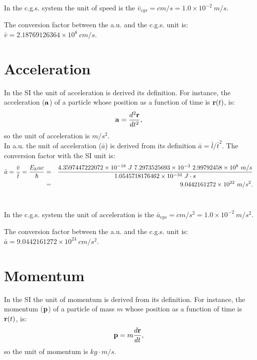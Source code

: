\documentclass[12pt,a4paper]{article}
\def\hbarf{1.0545718176462\times 10^{-34}}
\def\cspeed{2.99792458\times 10^{8}}
\def\alphaf{7.2973525693\times 10^{-3}}
\def\bara{9.0442161272\times 10^{22}}
\def\baru{4.3597447222072\times 10^{-18}}
\def\cmtom{1.0\times 10^{-2}}
\def\barvcgs{2.18769126364\times 10^{8}}
\def\baracgs{9.0442161272\times 10^{24}}
\begin{document}
{\color{orange} In the c.g.s. system the unit of speed is the 
$\bar v_{cgs}=cm/s = \cmtom\ m/s$.
\\
}

{\color{green} The conversion factor between the a.u. and the c.g.s. unit is:
$\bar v=\barvcgs\ cm/s$.
\\
}

\newpage
\section{\color{coral}Acceleration}
In the SI the unit of acceleration is derived its  
definition. For instance, the acceleration (${\bf a}$) of a particle whose
position as a function of time is ${\bf r}(t)$, is: 
\begin{equation}
{\bf a}={d^2{\bf r} \over dt^2},
\end{equation} 
so the unit of acceleration is $m/s^2$.
\\

{\color{web-blue} In a.u. the unit of acceleration ($\bar a$) is derived 
from its definition $\bar a = \bar l / \bar t^2$. The conversion factor
with the SI unit is:
\begin{eqnarray}
\bar a = {\bar v \over \bar t}={E_h \alpha c \over \hbar}&=& 
{\baru\ J\ \alphaf\ \cspeed\ m/s \over \hbarf\ J\cdot s}\nonumber \\
&=&\bara\ m/s^2.
\end{eqnarray}
\\
}

{\color{orange} In the c.g.s. system the unit of acceleration is the $\bar a_{cgs}=cm/s^2 = \cmtom\ m/s^2$.
\\
}

{\color{green} The conversion factor between the a.u. and the c.g.s. unit is:
$\bar a=\baracgs\ cm/s^2$.
\\
}

\newpage
\section{\color{coral}Momentum}
In the SI the unit of momentum is derived from its definition.
For instance, the momentum (${\bf p}$) of a particle of mass $m$ whose
position as a function of time is ${\bf r}(t)$, is:
\begin{equation}
{\bf p}=m {d{\bf r} \over dt},
\end{equation} 
so the unit of momentum is $kg\cdot m/s$.
\\
\end{document}
